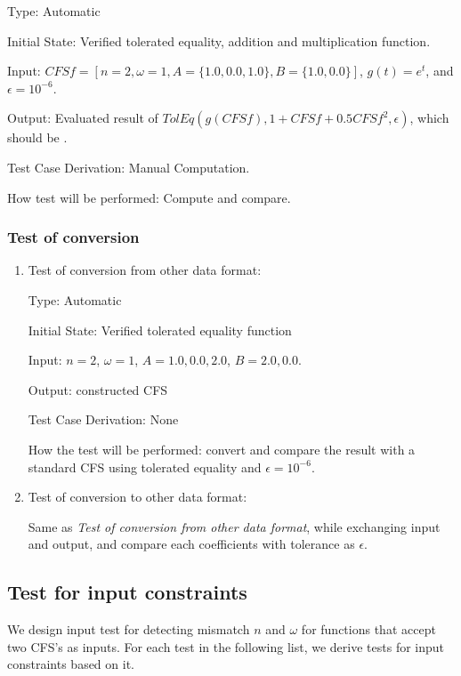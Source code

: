 \documentclass[12pt, titlepage]{article}
\begin{document}
\begin{enumerate}
	Type: Automatic
	
	Initial State: Verified tolerated equality, addition and multiplication function.
	
	Input: $\mathit{CFSf}=[n=2, \omega=1, A=\{1.0, 0.0, 1.0\}, B=\{1.0,
        0.0\}]$, $g(t)=e^t$, and $\epsilon=10^{-6}$.
	
	Output: Evaluated result of
        $\mathit{TolEq}(g(\mathit{CFSf}), 1+\mathit{CFSf}+0.5\mathit{CFSf}^2,
        \epsilon)$, which should be .
	
	Test Case Derivation: Manual Computation.
	
	How test will be performed: Compute and compare.
	
\end{enumerate}

\subsubsection{Test of conversion}

\begin{enumerate}
	\item{Test of conversion from other data format:\\}
	
	Type: Automatic
	
	Initial State: Verified tolerated equality function
	
	Input: $n=2$, $\omega=1$, $A={1.0, 0.0, 2.0}$, $B={2.0, 0.0}$.
	
	Output: constructed CFS
	
	Test Case Derivation: None
	
	How the test will be performed: convert and compare the result with a
        standard CFS using tolerated equality and $\epsilon=10^{-6}$.
	
	\item{Test of conversion to other data format:\\}
	
          Same as \textit{Test of conversion from other data format}, while
          exchanging input and output, and compare each coefficients with
          tolerance as $\epsilon$.
	
\end{enumerate}
\subsection{Test for input constraints}
We design input test for detecting mismatch $n$ and $\omega$ for functions that
accept two CFS's as inputs. For each test in the following list, we derive tests
for input constraints based on it.
\end{document}
